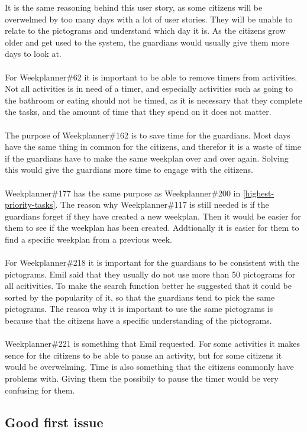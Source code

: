 It is the same reasoning behind this user story, as some citizens will be overwelmed by too many days with a lot of user stories. 
They will be unable to relate to the pictograms and understand which day it is.
As the citizens grow older and get used to the system, the guardians would usually give them more days to look at.
\\\\
For Weekplanner\#62 it is important to be able to remove timers from activities. 
Not all activities is in need of a timer, and especially activities such as going to the bathroom or eating should not be timed, as it is necessary that they complete the tasks, and the amount of time that they spend on it does not matter.
\\\\
The purpose of Weekplanner\#162 is to save time for the guardians. 
Most days have the same thing in common for the citizens, and therefor it is a waste of time if the guardians have to make the same weekplan over and over again.
Solving this would give the guardians more time to engage with the citizens.
\\\\
Weekplanner\#177 has the same purpose as Weekplanner\#200 in \autoref{highest-priority-tasks}. 
The reason why Weekplanner\#117 is still needed is if the guardians forget if they have created a new weekplan.
Then it would be easier for them to see if the weekplan has been created.
Addtionally it is easier for them to find a specific weekplan from a previous week.
\\\\
For Weekplanner\#218 it is important for the guardians to be consistent with the pictograms.
Emil said that they usually do not use more than 50 pictograms for all acitivities. 
To make the search function better he suggested that it could be sorted by the popularity of it, so that the guardians tend to pick the same pictograms.
The reason why it is important to use the same pictograms is because that the citizens have a specific understanding of the pictograms.
\\\\
Weekplanner\#221 is something that Emil requested. 
For some activities it makes sence for the citizens to be able to pause an activity, but for some citizens it would be overwelming.
Time is also something that the citizens commonly have problems with. 
Giving them the possibily to pause the timer would be very confusing for them.

\subsection{Good first issue}